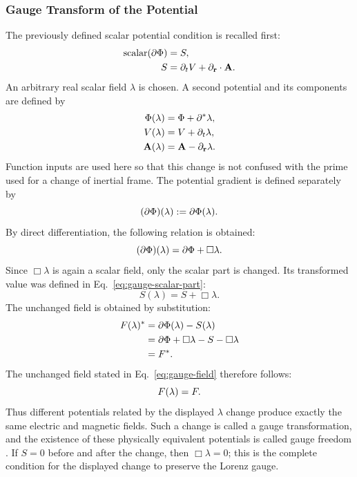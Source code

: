\subsubsection{Gauge Transform of the Potential}
The previously defined scalar potential condition is recalled first:
\begin{align*}
\operatorname{scalar}( \partial\Phi ) &= S, \\
S &= \partial _{t} V + \partial_{\mathbf{r}} \cdot \mathbf{A}.
\end{align*}
An arbitrary real scalar field \(\lambda\) is chosen. A second potential and
its components are defined by
\begin{align*}
\Phi(\lambda)
&=\Phi+\partial^*\lambda,\\
V(\lambda)&=V+\partial_t\lambda,\\
\mathbf{A}(\lambda)&=\mathbf{A}-\partial_{\mathbf{r}}\lambda.
\end{align*}
Function inputs are used here so that this change is not confused with the
prime used for a change of inertial frame. The potential gradient is defined
separately by
\begin{equation}
(\partial\Phi)(\lambda)
:=\partial\Phi(\lambda).
\label{eq:gauge-potential-gradient}
\end{equation}
By direct differentiation, the following relation is obtained:
\begin{equation*}
(\partial\Phi)(\lambda)
=\partial\Phi+\Box\lambda.
\end{equation*}
Since \(\Box\lambda\) is again a scalar field, only the scalar part is
changed. Its transformed value was defined in
Eq.\ \eqref{eq:gauge-scalar-part}:
\begin{equation*}
S(\lambda)=S+\Box\lambda.
\end{equation*}
The unchanged field is obtained by substitution:
\begin{align*}
F(\lambda)^{*}
&=\partial\Phi(\lambda)-S(\lambda)\notag\\
&=\partial\Phi+\Box\lambda-S-\Box\lambda\notag\\
&=F^{*}.
\end{align*}
The unchanged field stated in Eq.\ \eqref{eq:gauge-field} therefore follows:
\begin{equation*}
F(\lambda)=F.
\end{equation*}
Thus different potentials related by the displayed \(\lambda\) change
produce exactly the same electric and magnetic fields. Such a change is
called a gauge transformation, and the existence of these physically
equivalent potentials is called gauge freedom \cite{jackson1998}. If
\(S=0\) before and after the change, then
\(\Box\lambda=0\); this is the complete condition for the displayed change
to preserve the Lorenz gauge.


